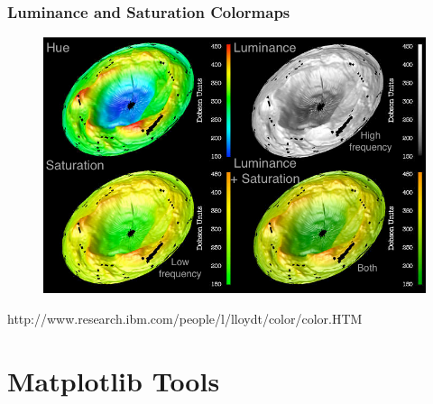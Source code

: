 \documentclass[ignorenonframetext]{beamer}
\begin{document}
\begin{frame}[t]\frametitle{Luminance and Saturation Colormaps}
    \begin{figure}
    	\centering
    	\includegraphics[width=.8\textwidth]{figures/luminance_vs_saturation.png}
    \end{figure}
    \tiny{http://www.research.ibm.com/people/l/lloydt/color/color.HTM}
\end{frame}





\section{Matplotlib Tools}
\end{document}
